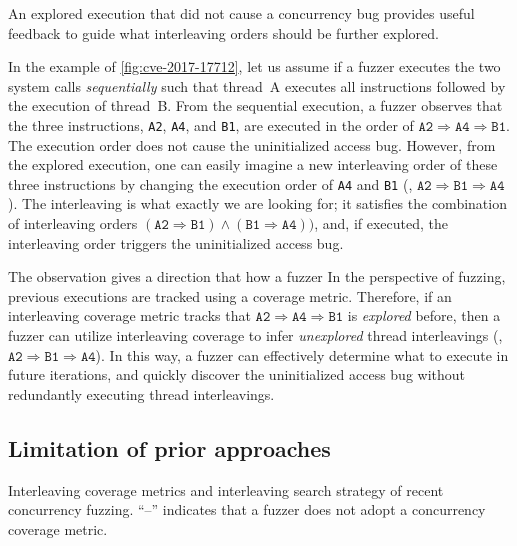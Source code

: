 %
An explored execution that did not cause a concurrency bug provides useful feedback 
to guide what interleaving orders should be further explored.

In the example of \autoref{fig:cve-2017-17712}, let us assume 
if a fuzzer executes the two system calls \textit{sequentially} 
such that thread~A executes all instructions followed by the execution of thread~B.
From the sequential execution, a fuzzer observes that the three instructions,
\texttt{A2}, \texttt{A4}, and \texttt{B1}, are  executed in the order of
$\texttt{A2} \Rightarrow \texttt{A4} \Rightarrow \texttt{B1}$. 
The execution order does not cause the uninitialized access bug.
%
However, from the explored execution, one can easily imagine a new interleaving order of these three
instructions by changing the execution order of \texttt{A4} and
\texttt{B1} (\ie,
$\texttt{A2} \Rightarrow \texttt{B1} \Rightarrow \texttt{A4}$).
%
The  interleaving is what exactly we are looking for; it
satisfies the combination of interleaving orders
$(\texttt{A2} \Rightarrow \texttt{B1}) \wedge (\texttt{B1} \Rightarrow
\texttt{A4}))$, and, if executed, the interleaving order triggers 
the uninitialized access bug.

The observation gives a direction that how a fuzzer 
%
In the perspective of fuzzing, previous executions are tracked using a
coverage metric.
%
Therefore, if an interleaving coverage metric tracks that
$\texttt{A2} \Rightarrow \texttt{A4} \Rightarrow \texttt{B1}$ is
\textit{explored} before, then a fuzzer can utilize interleaving
coverage to infer \textit{unexplored} thread interleavings (\eg,
$\texttt{A2} \Rightarrow \texttt{B1} \Rightarrow \texttt{A4}$).
%
In this way, a fuzzer can effectively determine what to execute in
future iterations, and quickly discover the uninitialized access bug
without redundantly executing thread interleavings.



\subsection{Limitation of prior approaches}
\label{ss:existingapproaches}
\begin{table}[t]
  \centering
  
  \caption{Interleaving coverage metrics and interleaving search
    strategy of recent concurrency fuzzing. ``--'' indicates that a
    fuzzer does not adopt a concurrency coverage metric. }
  \label{table:motivation}
\end{table}

